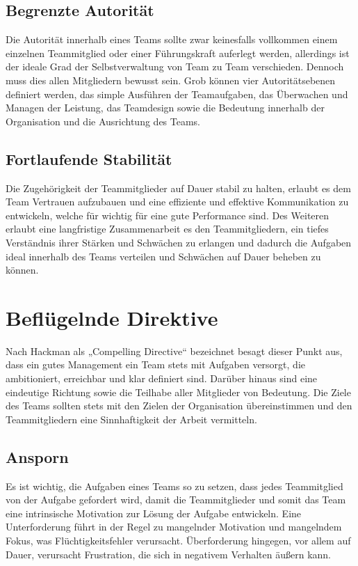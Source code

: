 \subsection{Begrenzte Autorität}
Die Autorität innerhalb eines Teams sollte zwar keinesfalls vollkommen einem einzelnen Teammitglied oder einer Führungskraft auferlegt werden, allerdings ist der ideale Grad der Selbstverwaltung von Team zu Team verschieden. Dennoch muss dies allen Mitgliedern bewusst sein. Grob können vier Autoritätsebenen definiert werden, das simple Ausführen der Teamaufgaben, das Überwachen und Managen der Leistung, das Teamdesign sowie die Bedeutung innerhalb der Organisation und die Ausrichtung des Teams.
\subsection{Fortlaufende Stabilität}
Die Zugehörigkeit der Teammitglieder auf Dauer stabil zu halten, erlaubt es dem Team Vertrauen aufzubauen und eine effiziente und effektive Kommunikation zu entwickeln, welche für wichtig für eine gute Performance sind. Des Weiteren erlaubt eine langfristige Zusammenarbeit es den Teammitgliedern, ein tiefes Verständnis ihrer Stärken und Schwächen zu erlangen und dadurch die Aufgaben ideal innerhalb des Teams verteilen und Schwächen auf Dauer beheben zu können.

\section{Beflügelnde Direktive}
Nach Hackman als „Compelling Directive“ bezeichnet besagt dieser Punkt aus, dass ein gutes Management ein Team stets mit Aufgaben versorgt, die ambitioniert, erreichbar und klar definiert sind. Darüber hinaus sind eine eindeutige Richtung sowie die Teilhabe aller Mitglieder von Bedeutung. Die Ziele des Teams sollten stets mit den Zielen der Organisation übereinstimmen und den Teammitgliedern eine Sinnhaftigkeit der Arbeit vermitteln.
\subsection{Ansporn}
Es ist wichtig, die Aufgaben eines Teams so zu setzen, dass jedes Teammitglied von der Aufgabe gefordert wird, damit die Teammitglieder und somit das Team eine intrinsische Motivation zur Lösung der Aufgabe entwickeln. Eine Unterforderung führt in der Regel zu mangelnder Motivation und mangelndem Fokus, was Flüchtigkeitsfehler verursacht. Überforderung hingegen, vor allem auf Dauer, verursacht Frustration, die sich in negativem Verhalten äußern kann.
